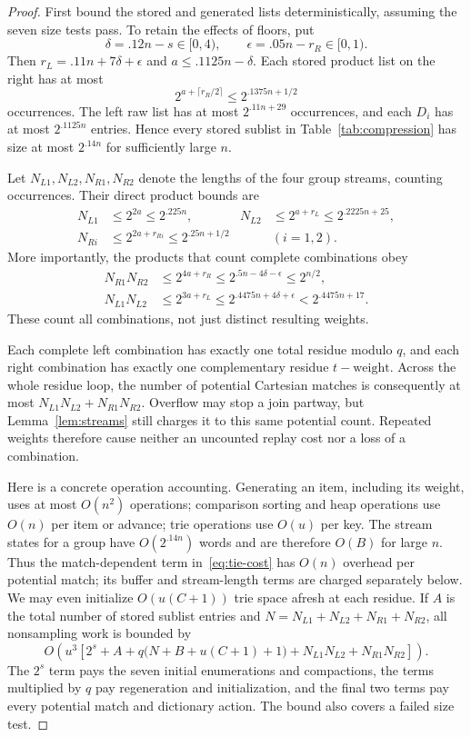 \begin{proof}
First bound the stored and generated lists deterministically, assuming
the seven size tests pass. To retain the effects of floors, put
\[
 \delta=.12n-s\in[0,4),\qquad
 \epsilon=.05n-r_R\in[0,1).
\]
Then $r_L=.11n+7\delta+\epsilon$ and
$a\le.1125n-\delta$. Each stored product list on the right
has at most
\[
 2^{a+\lceil r_R/2\rceil}\le 2^{.1375n+1/2}
\]
occurrences. The left raw list has at most $2^{.11n+29}$
occurrences, and each $D_i$ has at most $2^{.1125n}$ entries.
Hence every stored sublist in Table~\ref{tab:compression} has size
at most $2^{.14n}$ for sufficiently large $n$.

Let $N_{L1},N_{L2},N_{R1},N_{R2}$ denote the lengths of the four
group streams, counting occurrences. Their direct product bounds are
\[
\begin{aligned}
 N_{L1}&\le2^{2a}\le2^{.225n},&
 N_{L2}&\le2^{a+r_L}\le2^{.2225n+25},\\
 N_{Ri}&\le2^{2a+r_{Ri}}\le2^{.25n+1/2}
 &&(i=1,2).
\end{aligned}
\]
More importantly, the products that count complete combinations obey
\begin{align}
 N_{R1}N_{R2}
 &\le2^{4a+r_R}
 \le2^{.5n-4\delta-\epsilon}\le2^{n/2},
 \label{comp:right-product}\\
 N_{L1}N_{L2}
 &\le2^{3a+r_L}
 \le2^{.4475n+4\delta+\epsilon}
 <2^{.4475n+17}.
 \label{comp:left-product}
\end{align}
These count all combinations, not just distinct resulting weights.

Each complete left combination has exactly one total residue modulo
$q$, and each right combination has exactly one complementary
residue $t-\text{weight}$. Across the whole residue loop, the
number of potential Cartesian matches is consequently at most
$N_{L1}N_{L2}+N_{R1}N_{R2}$. Overflow may stop a join partway, but
Lemma~\ref{lem:streams} still charges it to this same potential
count. Repeated weights therefore cause neither an uncounted replay
cost nor a loss of a combination.

Here is a concrete operation accounting. Generating an item, including
its weight, uses at most $O(n^2)$ operations; comparison sorting and
heap operations use $O(n)$ per item or advance; trie operations use
$O(u)$ per key. The stream states for a group have $O(2^{.14n})$
words and are therefore $O(B)$ for large $n$. Thus the match-dependent
term in~\eqref{eq:tie-cost} has $O(n)$ overhead per potential match;
its buffer and stream-length terms are charged separately below.
We may even initialize $O(u(C+1))$ trie space afresh at each residue.
If $A$ is the total number of stored sublist entries and
$N=N_{L1}+N_{L2}+N_{R1}+N_{R2}$, all nonsampling work is bounded by
\begin{equation}
\label{comp:operation-ledger}
 O\left(u^3\left[
  2^s+A+q\bigl(N+B+u(C+1)+1\bigr)
  +N_{L1}N_{L2}+N_{R1}N_{R2}\right]\right).
\end{equation}
The $2^s$ term pays the seven initial enumerations and compactions,
the terms multiplied by $q$ pay regeneration and initialization, and
the final two terms pay every potential match and dictionary action.
The bound also covers a failed size test.


\end{proof}
